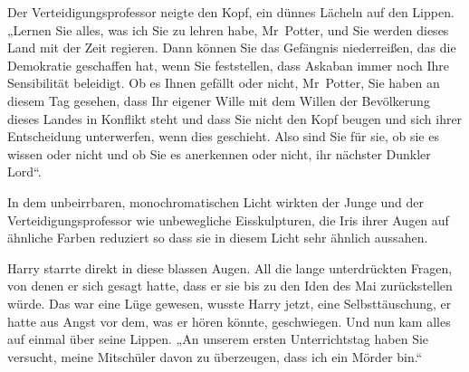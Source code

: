 Der Verteidigungsprofessor neigte den Kopf, ein dünnes Lächeln auf den Lippen. „Lernen Sie alles, was ich Sie zu lehren habe, Mr~Potter, und Sie werden dieses Land mit der Zeit regieren. Dann können Sie das Gefängnis niederreißen, das die Demokratie geschaffen hat, wenn Sie feststellen, dass Askaban immer noch Ihre Sensibilität beleidigt. Ob es Ihnen gefällt oder nicht, Mr~Potter, Sie haben an diesem Tag gesehen, dass Ihr eigener Wille mit dem Willen der Bevölkerung dieses Landes in Konflikt steht und dass Sie nicht den Kopf beugen und sich ihrer Entscheidung unterwerfen, wenn dies geschieht. Also sind Sie für sie, ob sie es wissen oder nicht und ob Sie es anerkennen oder nicht, ihr nächster Dunkler Lord“.

In dem unbeirrbaren, monochromatischen Licht wirkten der Junge und der Verteidigungsprofessor wie unbewegliche Eisskulpturen, die Iris ihrer Augen auf ähnliche Farben reduziert so dass sie in diesem Licht sehr ähnlich aussahen.

Harry starrte direkt in diese blassen Augen. All die lange unterdrückten Fragen, von denen er sich gesagt hatte, dass er sie bis zu den Iden des Mai zurückstellen würde. Das war eine Lüge gewesen, wusste Harry jetzt, eine Selbsttäuschung, er hatte aus Angst vor dem, was er hören könnte, geschwiegen. Und nun kam alles auf einmal über seine Lippen. „An unserem ersten Unterrichtstag haben Sie versucht, meine Mitschüler davon zu überzeugen, dass ich ein Mörder bin.“

